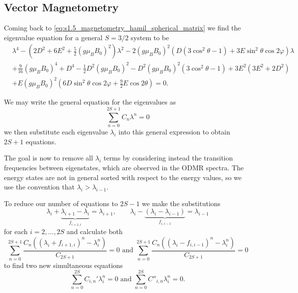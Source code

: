 

\subsection{Vector Magnetometry}
Coming back to \eqref{eq:s1.5_magnetometry_hamil_spherical_matrix} we find the eigenvalue equation for a general $S=3/2$ system to be
\begin{equation}
	\begin{align}
		 & \lambda^4 - \left(2D^2 + 6E^2  + \frac{5}{2}(g\mu_B B_0)^2 \right)\lambda^2 - 2 (g \mu_B B_0)^2 \left(D(3 \cos^2 \theta -1) + 3E \sin^2\theta \cos 2\varphi \right)\lambda \\
		 & +\frac{9}{16}(g \mu_B B_0)^4 + D^4 - \frac{1}{2}D^2 (g \mu_B B_0)^2 - D^2 (g \mu_B B_0)^2 (3 \cos^2 \theta - 1) + 3E^2(3E^2 + 2D^2)                                        \\
		 & + E(g\mu_BB_0)^2 (6D \sin^2\theta \cos 2\varphi + \frac{9}{2}E \cos2\theta) = 0.
	\end{align}
	\label{eq:V2_eigenvalue_equation}
\end{equation}

We may write the general equation for the eigenvalues as
\begin{equation}
	\sum_{n=0}^{2S+1} C_n \lambda^n = 0
	\label{eq:}
\end{equation}
we then substitute each eigenvalue $\lambda_i$ into this general expression to obtain $2S + 1$ equations.

The goal is now to remove all $\lambda_i$ terms by considering instead the transition frequencies between eigenstates, which are observed in the ODMR spectra. The energy states are not in general sorted with respect to the energy values, so we use the convention that $\lambda_i > \lambda_{i-1}$.

To reduce our number of equations to $2S-1$ we make the substitutions
$$\lambda_i + \underbrace{\lambda_{i+1} - \lambda_{i}}_{f_{i+1, i}} = \lambda_{i+1},
	\qquad\lambda_i - \underbrace{(\lambda_{i} - \lambda_{i-1})}_{f_{i, i-1}} = \lambda_{i-1}$$
for each $i = 2, \dots, 2S$ and calculate both
$$\sum_{n=0}^{2S +1} \frac{C_n \left((\lambda_i + f_{i+1, i})^n - \lambda_i^n\right)}{C_{2S+1}} = 0\text{ and } \sum_{n=0}^{2S +1}\frac{C_n \left((\lambda_i - f_{i, i-1})^n - \lambda_i^n\right)}{C_{2S + 1}} = 0$$
to find two new simultaneous equations
$$\sum_{n=0}^{2S} C_{i,n}' \lambda_i^n = 0 \text{ and } \sum_{n=0}^{2S} C''_{i,n}\lambda_i^n = 0.$$

